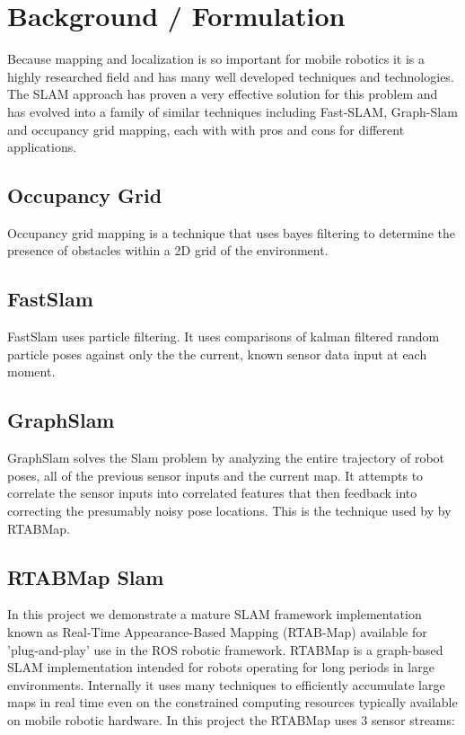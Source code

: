 \documentclass[10pt,journal,compsoc]{IEEEtran}
\begin{document}
\section{Background / Formulation}
Because mapping and localization is so important for mobile robotics it is a highly researched field and has many well developed techniques and technologies. The SLAM approach has proven a very effective solution for this problem and has evolved into a family of similar techniques including Fast-SLAM, Graph-Slam and occupancy grid mapping, each with with pros and cons for different applications. 

\subsection{Occupancy Grid}
Occupancy grid mapping is a technique that uses bayes filtering to determine the presence of obstacles within a 2D grid of the environment.

\subsection{FastSlam}
FastSlam uses particle filtering. It uses comparisons of kalman filtered random particle poses against only the the current, known sensor data input at each moment.

\subsection{GraphSlam}
GraphSlam solves the Slam problem by analyzing the entire trajectory of robot poses, all of the previous sensor inputs and the current map. It attempts to correlate the sensor inputs into correlated features that then feedback into correcting the  presumably noisy pose locations. This is the technique used by by RTABMap.

\subsection{RTABMap Slam}
In this project we demonstrate a mature SLAM framework implementation known as Real-Time Appearance-Based Mapping (RTAB-Map) available for 'plug-and-play' use in the ROS robotic framework. RTABMap is a graph-based SLAM implementation intended for robots operating for long periods in large environments. Internally it uses many techniques to efficiently accumulate large maps in real time even on the constrained computing resources typically available on mobile robotic hardware. In this project the RTABMap uses 3 sensor streams:
\end{document}
